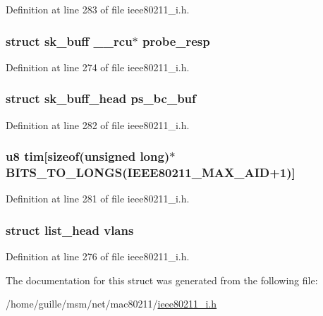 Definition at line 283 of file ieee80211\-\_\-i.\-h.

\hypertarget{structieee80211__if__ap_ab6e788ecb6d5a607e56fcd97d0996d69}{
\subsubsection[{probe\-\_\-resp}]{\setlength{\rightskip}{0pt plus 5cm}struct sk\-\_\-buff \-\_\-\-\_\-rcu$\ast$ probe\-\_\-resp}}\label{structieee80211__if__ap_ab6e788ecb6d5a607e56fcd97d0996d69}


Definition at line 274 of file ieee80211\-\_\-i.\-h.

\hypertarget{structieee80211__if__ap_ae1cfc557eb8683f9cb993a0e3c0003bb}{
\subsubsection[{ps\-\_\-bc\-\_\-buf}]{\setlength{\rightskip}{0pt plus 5cm}struct sk\-\_\-buff\-\_\-head ps\-\_\-bc\-\_\-buf}}\label{structieee80211__if__ap_ae1cfc557eb8683f9cb993a0e3c0003bb}


Definition at line 282 of file ieee80211\-\_\-i.\-h.

\hypertarget{structieee80211__if__ap_ac8921d232cd7bc324ccfe9d22525d030}{
\subsubsection[{tim}]{\setlength{\rightskip}{0pt plus 5cm}u8 tim\mbox{[}sizeof(unsigned long)$\ast$B\-I\-T\-S\-\_\-\-T\-O\-\_\-\-L\-O\-N\-G\-S(I\-E\-E\-E80211\-\_\-\-M\-A\-X\-\_\-\-A\-I\-D+1)\mbox{]}}}\label{structieee80211__if__ap_ac8921d232cd7bc324ccfe9d22525d030}


Definition at line 281 of file ieee80211\-\_\-i.\-h.

\hypertarget{structieee80211__if__ap_ad647c724f4509c4bb97a527552b6497a}{
\subsubsection[{vlans}]{\setlength{\rightskip}{0pt plus 5cm}struct list\-\_\-head vlans}}\label{structieee80211__if__ap_ad647c724f4509c4bb97a527552b6497a}


Definition at line 276 of file ieee80211\-\_\-i.\-h.



The documentation for this struct was generated from the following file\-:\begin{DoxyCompactItemize}
\item 
/home/guille/msm/net/mac80211/\hyperlink{ieee80211__i_8h}{ieee80211\-\_\-i.\-h}\end{DoxyCompactItemize}
